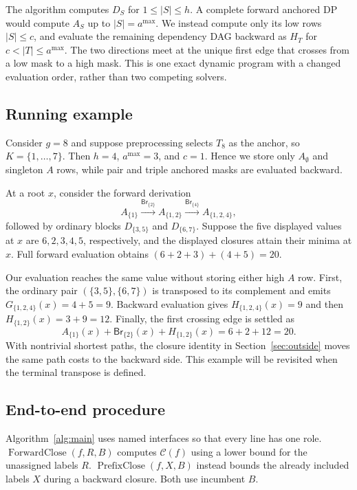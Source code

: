 \documentclass[sigconf,nonacm]{acmart}
\newcommand{\Clos}{\mathcal{C}}
\newcommand{\Br}{\mathsf{Br}}
\newcommand{\BoundedClosure}{\operatorname{ForwardClose}}
\newcommand{\PrefixClosure}{\operatorname{PrefixClose}}
\begin{document}
The algorithm computes $D_S$ for $1\leq|S|\leq h$.  A complete forward anchored DP would compute $A_S$ up to $|S|=a^{\max}$.  We instead compute only its low rows $|S|\leq c$, and evaluate the remaining dependency DAG backward as $H_T$ for $c<|T|\leq a^{\max}$.  The two directions meet at the unique first edge that crosses from a low mask to a high mask.  This is one exact dynamic program with a changed evaluation order, rather than two competing solvers.

\subsection{Running example}
\label{sec:example}

Consider $g=8$ and suppose preprocessing selects $T_8$ as the anchor, so $K=\{1,\ldots,7\}$.  Then $h=4$, $a^{\max}=3$, and $c=1$.  Hence we store only $A_\emptyset$ and singleton $A$ rows, while pair and triple anchored masks are evaluated backward.

At a root $x$, consider the forward derivation
\[
 A_{\{1\}}\xrightarrow{\Br_{\{2\}}}A_{\{1,2\}}
 \xrightarrow{\Br_{\{4\}}}A_{\{1,2,4\}},
\]
followed by ordinary blocks $D_{\{3,5\}}$ and $D_{\{6,7\}}$.  Suppose the five displayed values at $x$ are $6,2,3,4,5$, respectively, and the displayed closures attain their minima at $x$.  Full forward evaluation obtains $(6+2+3)+(4+5)=20$.

Our evaluation reaches the same value without storing either high $A$ row.  First, the ordinary pair $(\{3,5\},\{6,7\})$ is transposed to its complement and emits $G_{\{1,2,4\}}(x)=4+5=9$.  Backward evaluation gives $H_{\{1,2,4\}}(x)=9$ and then $H_{\{1,2\}}(x)=3+9=12$.  Finally, the first crossing edge is settled as
\[
 A_{\{1\}}(x)+\Br_{\{2\}}(x)+H_{\{1,2\}}(x)=6+2+12=20.
\]
With nontrivial shortest paths, the closure identity in Section~\ref{sec:outside} moves the same path costs to the backward side.  This example will be revisited when the terminal transpose is defined.

\subsection{End-to-end procedure}

Algorithm~\ref{alg:main} uses named interfaces so that every line has one role.  $\BoundedClosure(f,R,B)$ computes $\Clos(f)$ using a lower bound for the unassigned labels $R$.  $\PrefixClosure(f,X,B)$ instead bounds the already included labels $X$ during a backward closure.  Both use incumbent $B$.
\end{document}
